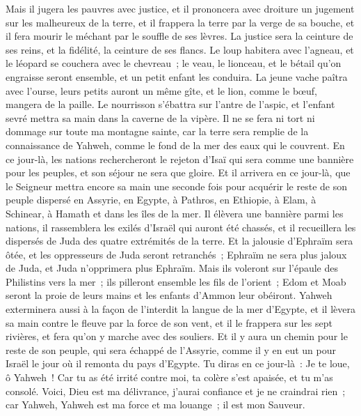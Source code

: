 \begin{multicols}{2}
Mais il jugera les pauvres avec justice, et il prononcera avec droiture un jugement sur les malheureux de la terre, et il frappera la terre par la verge de sa bouche, et il fera mourir le méchant par le souffle de ses lèvres.
La justice sera la ceinture de ses reins, et la fidélité, la ceinture de ses flancs.
Le loup habitera avec l'agneau, et le léopard se couchera avec le chevreau~; le veau, le lionceau, et le bétail qu'on engraisse seront ensemble, et un petit enfant les conduira.
La jeune vache paîtra avec l'ourse, leurs petits auront un même gîte, et le lion, comme le bœuf, mangera de la paille.
Le nourrisson s'ébattra sur l'antre de l'aspic, et l'enfant sevré mettra sa main dans la caverne de la vipère.
Il ne se fera ni tort ni dommage sur toute ma montagne sainte, car la terre sera remplie de la connaissance de Yahweh, comme le fond de la mer des eaux qui le couvrent.
En ce jour-là, les nations rechercheront le rejeton d'Isaï qui sera comme une bannière pour les peuples, et son séjour ne sera que gloire.
Et il arrivera en ce jour-là, que le Seigneur mettra encore sa main une seconde fois pour acquérir le reste de son peuple dispersé en Assyrie, en Egypte, à Pathros, en Ethiopie, à Elam, à Schinear, à Hamath et dans les îles de la mer.
Il élèvera une bannière parmi les nations, il rassemblera les exilés d'Israël qui auront été chassés, et il recueillera les dispersés de Juda des quatre extrémités de la terre.
Et la jalousie d'Ephraïm sera ôtée, et les oppresseurs de Juda seront retranchés~; Ephraïm ne sera plus jaloux de Juda, et Juda n'opprimera plus Ephraïm.
Mais ils voleront sur l'épaule des Philistins vers la mer~; ils pilleront ensemble les fils de l'orient~; Edom et Moab seront la proie de leurs mains et les enfants d'Ammon leur obéiront.
Yahweh exterminera aussi à la façon de l'interdit la langue de la mer d'Egypte, et il lèvera sa main contre le fleuve par la force de son vent, et il le frappera sur les sept rivières, et fera qu'on y marche avec des souliers.
Et il y aura un chemin pour le reste de son peuple, qui sera échappé de l'Assyrie, comme il y en eut un pour Israël le jour où il remonta du pays d'Egypte.
\VerseOne{}Tu diras en ce jour-là~: Je te loue, ô Yahweh~! Car tu as été irrité contre moi, ta colère s'est apaisée, et tu m'as consolé.
Voici, Dieu est ma délivrance, j'aurai confiance et je ne craindrai rien~; car Yahweh, Yahweh est ma force et ma louange~; il est mon Sauveur.

\end{multicols}
